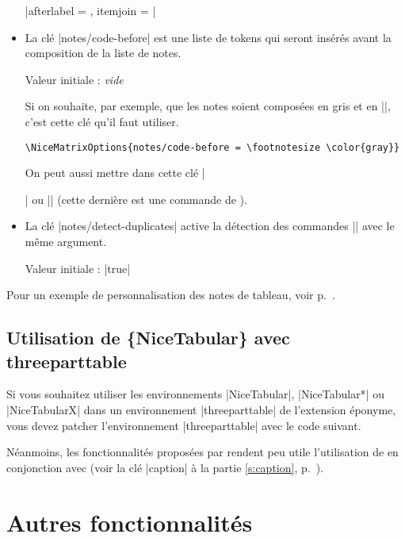 \documentclass[dvipsnames]{article}%
\begin{document}
\begin{itemize}[itemsep=\medskipamount]
|afterlabel = \nobreak, itemjoin = \quad|


\item La clé |notes/code-before| est une liste de tokens qui seront insérés
avant la composition de la liste de notes.

Valeur initiale : \textsl{vide}

Si on souhaite, par exemple, que les notes soient composées en gris et en
|\footnotesize|, c'est cette clé qu'il faut utiliser.
\begin{Verbatim}
\NiceMatrixOptions{notes/code-before = \footnotesize \color{gray}}
\end{Verbatim}
On peut aussi mettre dans cette clé |\raggedright| ou |\RaggedRight| (cette
dernière est une commande de ).

\item La clé |notes/detect-duplicates| active la détection des
commandes |\tabularnote| avec le même argument.

Valeur initiale : |true|
\end{itemize}



\medskip
Pour un exemple de personnalisation des notes de tableau, voir p.~\pageref{ex:notes}.


\subsection{Utilisation de \{NiceTabular\} avec threeparttable}


Si vous souhaitez utiliser les environnements |{NiceTabular}|, |{NiceTabular*}|
ou |{NiceTabularX}| dans un environnement |{threeparttable}| de l'extension
éponyme, vous devez patcher l'environnement |{threeparttable}| avec le code
suivant.

\begin{Code}
\makeatletter
{}
  {}
\makeatother
\end{Code}

Néanmoins, les fonctionnalités proposées par  rendent peu utile
l'utilisation de  en conjonction avec  (voir
la clé |caption| à la partie \ref{s:caption}, p.~\pageref{s:caption}).


\section{Autres fonctionnalités}
\end{document}
